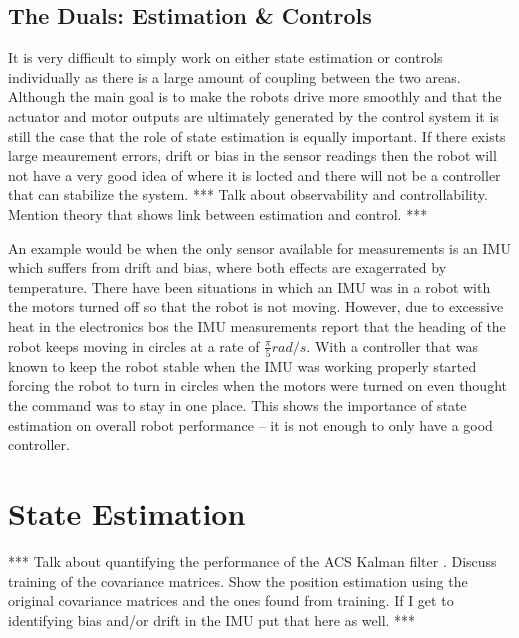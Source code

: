 \documentclass[12pt]{report}
\begin{document}
\begin{spacing}{1.1}
\section{The Duals: Estimation \& Controls}
It is very difficult to simply work on either state estimation or controls individually as there is a large amount of coupling between the two areas. Although the main goal is to make the robots drive more smoothly and that the actuator and motor outputs are ultimately generated by the control system it is still the case that the role of state estimation is equally important. If there exists large meaurement errors, drift or bias in the sensor readings then the robot will not have a very good idea of where it is locted and there will not be a controller that can stabilize the system. *** Talk about observability and controllability. Mention theory that shows link between estimation and control. ***

An example would be when the only sensor available for measurements is an IMU which suffers from drift and bias, where both effects are exagerrated by temperature. There have been situations in which an IMU was in a robot with the motors turned off so that the robot is not moving. However, due to excessive heat in the electronics bos the IMU measurements report that the heading of the robot keeps moving in circles at a rate of $\frac{\pi}{5} rad/s$. With a controller that was known to keep the robot stable when the IMU was working properly started forcing the robot to turn in circles when the motors were turned on even thought the command was to stay in one place. This shows the importance of state estimation on overall robot performance -- it is not enough to only have a good controller.

\clearpage


\chapter{State Estimation}
*** Talk about quantifying the performance of the ACS Kalman filter \cite{Sights06}. Discuss training of the covariance matrices. Show the position estimation using the original covariance matrices and the ones found from training. If I get to identifying bias and/or drift in the IMU put that here as well. ***


\end{spacing}
\end{document}
